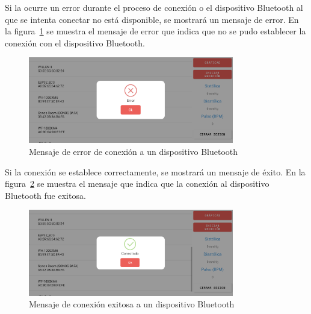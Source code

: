     Si la ocurre un error durante el proceso de conexión o el dispositivo Bluetooth al que se intenta conectar no está disponible, se mostrará un mensaje de error. En la figura~\ref{fig:Android_ErrorConexion} se muestra el mensaje de error que indica que no se pudo establecer la conexión con el dispositivo Bluetooth.

    \begin{figure}[H]
        \centering
        \includegraphics[width=0.8\textwidth]{img/Resultados/android_errorConexion.png}
        \caption[Mensaje de error de conexión a un dispositivo Bluetooth.]{Mensaje de error de conexión a un dispositivo Bluetooth\footnotemark}
        \label{fig:Android_ErrorConexion}
    \end{figure}

    Si la conexión se establece correctamente, se mostrará un mensaje de éxito. En la figura~\ref{fig:Android_ConexionExitosa} se muestra el mensaje que indica que la conexión al dispositivo Bluetooth fue exitosa.

    \begin{figure}[H]
        \centering
        \includegraphics[width=0.8\textwidth]{img/Resultados/android_conexionExitosa.png}
        \caption[Mensaje de conexión exitosa a un dispositivo Bluetooth.]{Mensaje de conexión exitosa a un dispositivo Bluetooth\footnotemark}
        \label{fig:Android_ConexionExitosa}
    \end{figure}

